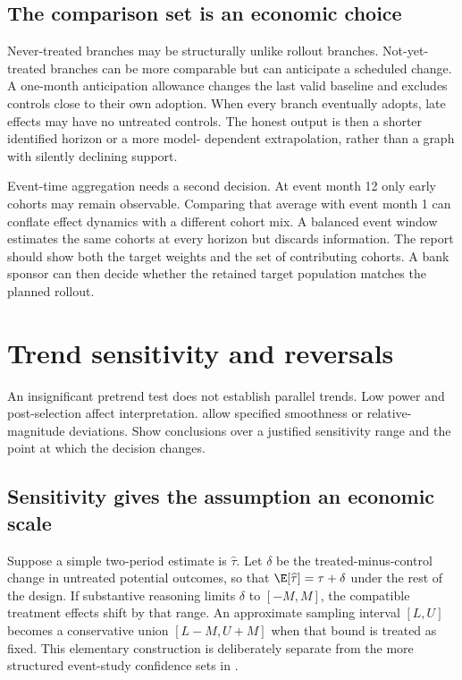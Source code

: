 \subsection{The comparison set is an economic choice}
Never-treated branches may be structurally unlike rollout branches.
Not-yet-treated branches can be more comparable but can anticipate a
scheduled change. A one-month anticipation allowance changes the last valid
baseline and excludes controls close to their own adoption. When every
branch eventually adopts, late effects may have no untreated controls.
The honest output is then a shorter identified horizon or a more model-
dependent extrapolation, rather than a graph with silently declining support.

Event-time aggregation needs a second decision. At event month 12 only early
cohorts may remain observable. Comparing that average with event month 1
can conflate effect dynamics with a different cohort mix. A balanced event
window estimates the same cohorts at every horizon but discards information.
The report should show both the target weights and the set of contributing
cohorts. A bank sponsor can then decide whether the retained target
population matches the planned rollout.

\section{Trend sensitivity and reversals}
An insignificant pretrend test does not establish parallel trends. Low power
and post-selection affect interpretation. \citet{rambachan2023} allow
specified smoothness or relative-magnitude deviations. Show conclusions
over a justified sensitivity range and the point at which the decision
changes.

\subsection{Sensitivity gives the assumption an economic scale}
Suppose a simple two-period estimate is $\widehat\tau$. Let
$\delta$ be the treated-minus-control change in untreated potential
outcomes, so that $\E[\widehat\tau]=\tau+\delta$ under the rest of
the design. If substantive reasoning limits $\delta$ to $[-M,M]$,
the compatible treatment effects shift by that range. An approximate
sampling interval $[L,U]$ becomes a conservative union
$[L-M,U+M]$ when that bound is treated as fixed. This elementary
construction is deliberately separate from the more structured event-study
confidence sets in \citet{rambachan2023}.

